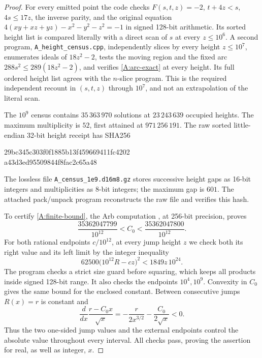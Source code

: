 \begin{proof}
For every emitted point the code checks $F(s,t,z)=-2$,
$t+4z<s$, $4s\leq17z$, the inverse parity, and the original equation
$4(xy+xz+yz)-x^2-y^2-z^2=-1$ in signed 128-bit arithmetic.
Its sorted height list is compared literally with a direct scan of
$s$ at every $z\leq10^6$. A second program,
\texttt{A\_height\_census.cpp}, independently slices by every height
$z\leq10^7$, enumerates ideals of $18z^2-2$, tests the moving region
and the fixed arc $288s^2\leq289(18z^2-2)$, and verifies
\eqref{A:arc-exact} at every height. Its full ordered height list agrees
with the $n$-slice program. This is the required independent recount in
$(s,t,z)$ through $10^7$, and not an extrapolation of the literal scan.

The $10^9$ census contains $35\,363\,970$ solutions at
$23\,243\,639$ occupied heights. The maximum multiplicity is $52$,
first attained at $971\,256\,191$. The raw sorted little-endian
32-bit height receipt has SHA256
\begin{center}\small\ttfamily
29bc345c303f0f1885b13f459669411fc4202\\
a43d3ed95509844f8fac2c65a48
\end{center}
The lossless file \texttt{A\_census\_1e9.d16m8.gz} stores successive
height gaps as 16-bit integers and multiplicities as 8-bit integers;
the maximum gap is $601$. The attached pack/unpack program reconstructs
the raw file and verifies this hash.

To certify \eqref{A:finite-bound}, the Arb computation
, at 256-bit precision, proves
\[
 \frac{35362047799}{10^{12}}<C_0<
 \frac{35362047800}{10^{12}}.
\]
For both rational endpoints $c/10^{12}$, at every jump height $z$ we
check both its right value and its left limit by the integer inequality
\[
 62500\big(10^{12}R-cz\big)^2
       <1849z\,10^{24}.
\]
The program checks a strict size guard before squaring, which keeps all
products inside signed 128-bit range. It also checks the endpoints
$10^4,10^9$. Convexity in $C_0$ gives the same bound for the enclosed
constant. Between consecutive jumps $R(x)=r$ is constant and
\[
 \frac{d}{dx}\frac{r-C_0x}{\sqrt x}
 =-\frac{r}{2x^{3/2}}-\frac{C_0}{2\sqrt x}<0.
\]
Thus the two one-sided jump values and the external endpoints control
the absolute value throughout every interval. All checks pass, proving
the assertion for real, as well as integer, $x$.
\end{proof}

